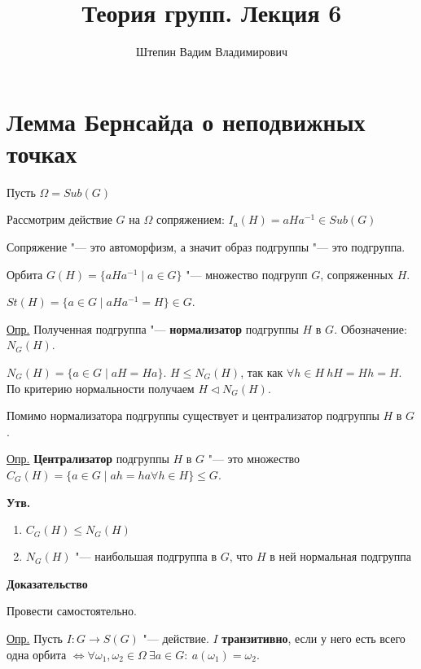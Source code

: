 \documentclass{article}
\title{Теория групп. Лекция 6}
\author{Штепин Вадим Владимирович}
\date{\DTMdate{2019-10-10}}
\begin{document}
\maketitle

\section{Лемма Бернсайда о неподвижных точках}

Пусть $\Omega = Sub(G)$

Рассмотрим действие $G$ на $\Omega$ сопряжением: $I_a(H) = aHa^{-1} \in Sub(G)$

Сопряжение "--- это автоморфизм, а значит образ подгруппы "--- это подгруппа.

Орбита $G(H) = \{aHa^{-1} \mid a \in G\}$ "--- множество подгрупп $G$, сопряженных $H$.

$St(H) = \{a \in G \mid aHa^{-1}=H\} \in G$.

\vspace{5pt}

\underline{Опр.} Полученная подгруппа "--- \textbf{нормализатор} подгруппы $H$ в $G$. Обозначение: $N_G(H)$.

$N_G(H) = \{a \in G \mid aH = Ha\}$. $H \leq N_G(H)$, так как $\forall h \in H \  hH = Hh = H$. По критерию нормальности получаем $H \triangleleft N_G(H)$.

Помимо нормализатора подгруппы существует и централизатор подгруппы $H$ в $G$.

\vspace{5pt}

\underline{Опр.} \textbf{Централизатор} подгруппы $H$ в $G$ "--- это множество $C_G(H) = \{a \in G \mid ah = ha \forall h \in H\} \leq G$.

\vspace{10pt}

\textbf{Утв.}
\begin{enumerate}
	\item $C_G(H) \leq N_G(H)$
	\item $N_G(H)$ "--- наибольшая подгруппа в $G$, что $H$ в ней нормальная подгруппа
\end{enumerate}

\textbf{Доказательство}

Провести самостоятельно.

\vspace{10pt}

\underline{Опр.} Пусть $I : G \rightarrow S(G)$ "--- действие. $I$ \textbf{транзитивно}, если у него есть всего одна орбита $\Leftrightarrow \forall \omega_1, \omega_2 \in \Omega \  \exists a \in G: \  a(\omega_1) = \omega_2$.
\end{document}
